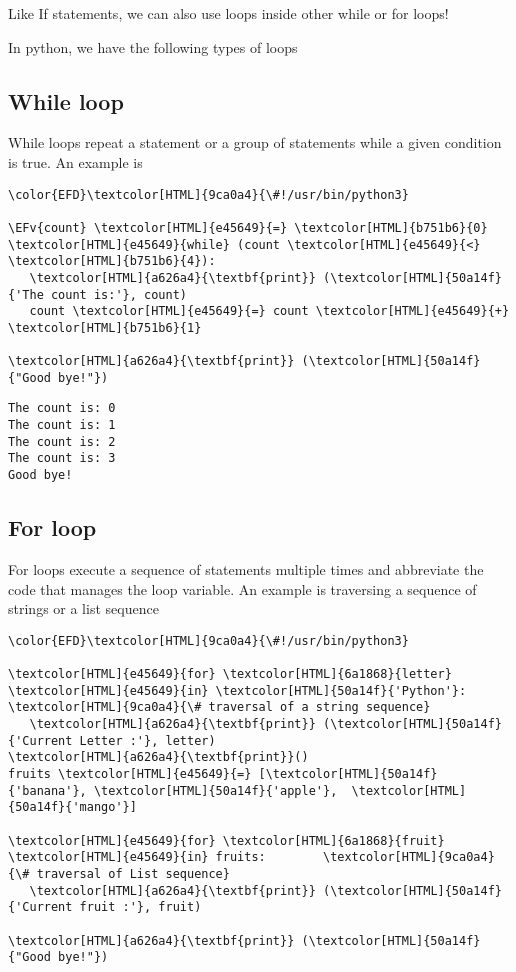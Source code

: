 \documentclass{scrartcl}
\newcommand{\EFv}[1]{\textcolor{EFv}{#1}} %
\begin{document}
Like If statements, we can also use loops inside other while or for loops!

In python, we have the following types of loops

\subsection{While loop}
\label{sec:orgbcd286f}
While loops repeat a statement or a group of statements while a given condition
is true. An example is
\begin{Code}
\begin{Verbatim}[]
\color{EFD}\textcolor[HTML]{9ca0a4}{\#!/usr/bin/python3}

\EFv{count} \textcolor[HTML]{e45649}{=} \textcolor[HTML]{b751b6}{0}
\textcolor[HTML]{e45649}{while} (count \textcolor[HTML]{e45649}{<} \textcolor[HTML]{b751b6}{4}):
   \textcolor[HTML]{a626a4}{\textbf{print}} (\textcolor[HTML]{50a14f}{'The count is:'}, count)
   count \textcolor[HTML]{e45649}{=} count \textcolor[HTML]{e45649}{+} \textcolor[HTML]{b751b6}{1}

\textcolor[HTML]{a626a4}{\textbf{print}} (\textcolor[HTML]{50a14f}{"Good bye!"})
\end{Verbatim}
\end{Code}

\begin{verbatim}
The count is: 0
The count is: 1
The count is: 2
The count is: 3
Good bye!
\end{verbatim}

\subsection{For loop}
\label{sec:org8103c30}
For loops execute a sequence of statements multiple times and abbreviate the
code that manages the loop variable. An example is traversing a sequence of
strings or a list sequence
\begin{Code}
\begin{Verbatim}[]
\color{EFD}\textcolor[HTML]{9ca0a4}{\#!/usr/bin/python3}

\textcolor[HTML]{e45649}{for} \textcolor[HTML]{6a1868}{letter} \textcolor[HTML]{e45649}{in} \textcolor[HTML]{50a14f}{'Python'}:     \textcolor[HTML]{9ca0a4}{\# traversal of a string sequence}
   \textcolor[HTML]{a626a4}{\textbf{print}} (\textcolor[HTML]{50a14f}{'Current Letter :'}, letter)
\textcolor[HTML]{a626a4}{\textbf{print}}()
fruits \textcolor[HTML]{e45649}{=} [\textcolor[HTML]{50a14f}{'banana'}, \textcolor[HTML]{50a14f}{'apple'},  \textcolor[HTML]{50a14f}{'mango'}]

\textcolor[HTML]{e45649}{for} \textcolor[HTML]{6a1868}{fruit} \textcolor[HTML]{e45649}{in} fruits:        \textcolor[HTML]{9ca0a4}{\# traversal of List sequence}
   \textcolor[HTML]{a626a4}{\textbf{print}} (\textcolor[HTML]{50a14f}{'Current fruit :'}, fruit)

\textcolor[HTML]{a626a4}{\textbf{print}} (\textcolor[HTML]{50a14f}{"Good bye!"})
\end{Verbatim}
\end{Code}
\end{document}

